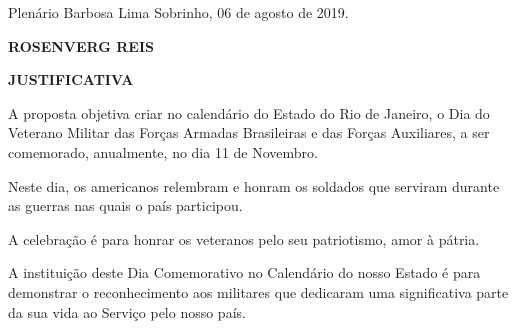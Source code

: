 \documentclass[10pt]{article}
\begin{document}
\begin{center}
  Plenário Barbosa Lima Sobrinho, 06 de agosto de 2019.

   \bigskip

  \textbf{ ROSENVERG REIS}

  \bigskip

  \textbf{JUSTIFICATIVA}
  \bigskip

\end{center}

  A proposta objetiva criar no calendário do Estado do Rio de Janeiro, o Dia do Veterano Militar das Forças Armadas Brasileiras e das Forças Auxiliares, a ser comemorado, anualmente, no dia 11 de Novembro.

Neste dia, os americanos relembram e honram os soldados que serviram durante as guerras nas quais o país participou.

A celebração é para honrar os veteranos pelo seu patriotismo, amor à pátria.

A instituição deste Dia Comemorativo no Calendário do nosso Estado é para demonstrar o reconhecimento aos militares que dedicaram uma significativa parte da sua vida ao Serviço pelo nosso país. 




\iffalse
\begin{center}
  \textbf{REFERÊNCIAS}
\end{center}


\fi
\end{document}
